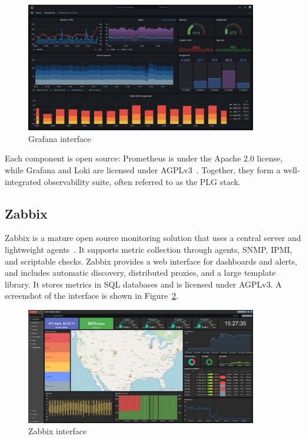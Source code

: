 \begin{figure}[H]
  \centering
  \includegraphics[width=0.9\textwidth]{imaxes/grafana-ui.png}
  \caption{Grafana interface}
  \label{fig:grafana-ui}
\end{figure}

Each component is open source: Prometheus is under the Apache 2.0 license, while Grafana and Loki are licensed under AGPLv3~\cite{grafana_license_change}. Together, they form a well-integrated observability suite, often referred to as the PLG stack.

\subsection{Zabbix}
Zabbix is a mature open source monitoring solution that uses a central server and lightweight agents~\cite{zabbix_web}. It supports metric collection through agents, SNMP, IPMI, and scriptable checks. Zabbix provides a web interface for dashboards and alerts, and includes automatic discovery, distributed proxies, and a large template library. It stores metrics in SQL databases and is licensed under AGPLv3. A screenshot of the interface is shown in Figure~\ref{fig:zabbix-ui}.

\begin{figure}[H]
  \centering
  \includegraphics[width=0.9\textwidth]{imaxes/zabbix-ui.png}
  \caption{Zabbix interface}
  \label{fig:zabbix-ui}
\end{figure}

